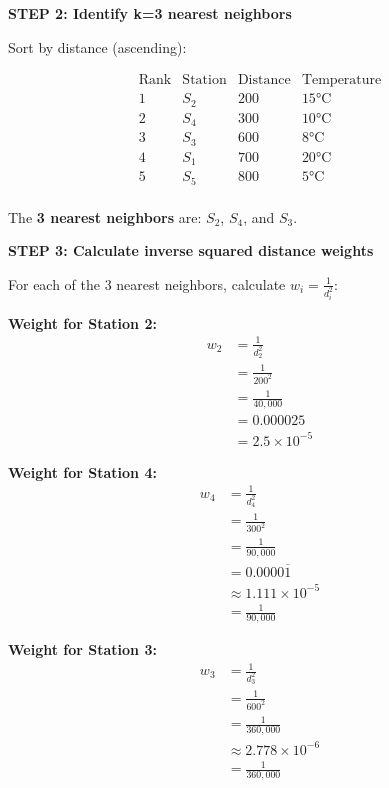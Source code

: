 \documentclass[12pt]{article}
\begin{document}
\begin{solution}
\textbf{STEP 2: Identify k=3 nearest neighbors}

Sort by distance (ascending):

\[
\begin{array}{c|c|c|c}
\text{Rank} & \text{Station} & \text{Distance} & \text{Temperature} \\
\hline
1 & S_2 & 200 & 15°\text{C} \\
2 & S_4 & 300 & 10°\text{C} \\
3 & S_3 & 600 & 8°\text{C} \\
\hline
4 & S_1 & 700 & 20°\text{C} \\
5 & S_5 & 800 & 5°\text{C} \\
\end{array}
\]

The \textbf{3 nearest neighbors} are: \(S_2\), \(S_4\), and \(S_3\).

\textbf{STEP 3: Calculate inverse squared distance weights}

For each of the 3 nearest neighbors, calculate \(w_i = \frac{1}{d_i^2}\):

\textbf{Weight for Station 2:}
\begin{align*}
w_2 &= \frac{1}{d_2^2} \\
&= \frac{1}{200^2} \\
&= \frac{1}{40{,}000} \\
&= 0.000025 \\
&= \boxed{2.5 \times 10^{-5}}
\end{align*}

\textbf{Weight for Station 4:}
\begin{align*}
w_4 &= \frac{1}{d_4^2} \\
&= \frac{1}{300^2} \\
&= \frac{1}{90{,}000} \\
&= 0.0000\overline{1} \\
&\approx 1.111 \times 10^{-5} \\
&= \boxed{\frac{1}{90{,}000}}
\end{align*}

\textbf{Weight for Station 3:}
\begin{align*}
w_3 &= \frac{1}{d_3^2} \\
&= \frac{1}{600^2} \\
&= \frac{1}{360{,}000} \\
&\approx 2.778 \times 10^{-6} \\
&= \boxed{\frac{1}{360{,}000}}
\end{align*}


\end{solution}
\end{document}
